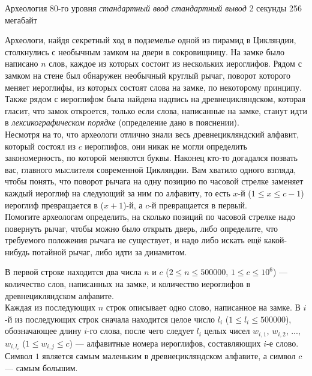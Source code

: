 \begin{problem}%
{Археология 80-го уровня}%
{\textsl{стандартный ввод}}%
{\textsl{стандартный вывод}}%
{2 секунды}%
{256 мегабайт}%
{}

Археологи, найдя секретный ход в подземелье одной из пирамид в Цикляндии, столкнулись с необычным замком на двери в сокровищницу. На замке было написано $n$ слов, каждое из которых состоит из нескольких иероглифов. Рядом с замком на стене был обнаружен необычный круглый рычаг, поворот которого меняет иероглифы, из которых состоят слова на замке, по некоторому принципу. Также рядом с иероглифом была найдена надпись на древнецикляндском, которая гласит, что замок откроется, только если слова, написанные на замке, станут идти в \textit{лексикографическом порядке} (определение дано в пояснении).\\

Несмотря на то, что археологи отлично знали весь древнецикляндский алфавит, который состоял из $c$ иероглифов, они никак не могли определить закономерность, по которой меняются буквы. Наконец кто-то догадался позвать вас, главного мыслителя современной Цикляндии. Вам хватило одного взгляда, чтобы понять, что поворот рычага на одну позицию по часовой стрелке заменяет каждый иероглиф на следующий за ним по алфавиту, то есть $x$-й ($1 \le x \le c - 1$) иероглиф превращается в ($x + 1$)-й, а $c$-й превращается в первый.\\

Помогите археологам определить, на сколько позиций по часовой стрелке надо повернуть рычаг, чтобы можно было открыть дверь, либо определите, что требуемого положения рычага не существует, и надо либо искать ещё какой-нибудь потайной рычаг, либо идти за динамитом.

\InputFile

В первой строке находится два числа $n$ и $c$ ($2 \le n \le 500000$, $1 \le c \le 10^6$) — количество слов, написанных на замке, и количество иероглифов в древнецикляндском алфавите.\\

Каждая из последующих $n$ строк описывает одно слово, написанное на замке. В $i$-й из последующих строк сначала находится целое число $l_i$ ($1 \le l_i \le 500000$), обозначающее длину $i$-го слова, после чего следует $l_i$ целых чисел $w_{i, 1}$, $w_{i, 2}$, ..., $w_{i, l_i}$ ($1 \le w_{i, j} \le c$) — алфавитные номера иероглифов, составляющих $i$-е слово. Символ $1$ является самым маленьким в древнецикляндском алфавите, а символ $c$ — самым большим.\\


\end{problem}
